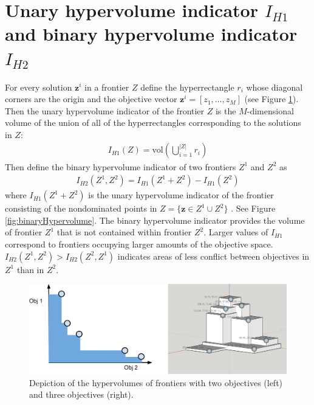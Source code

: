 \section{Unary hypervolume indicator $I_{H1}$ and binary hypervolume indicator $I_{H2}$}
\label{sec:hypervolumeIndicator}
For every solution $\mathbf{z}^i$ in a frontier $Z$ define the hyperrectangle $r_i$ whose diagonal corners are the origin and the objective vector $\mathbf{z}^i = [z_1,\ldots,z_M]$ (see Figure \ref{fig:frontierVolumes}). Then the unary hypervolume indicator of the frontier $Z$ is the $M$-dimensional volume of the union of all of the hyperrectangles corresponding to the solutions in $Z$:
\begin{align}
I_{H1} (Z) = \text{vol} \left( \bigcup_{i = 1}^{|Z|} r_i \right)
\end{align}
Then define the binary hypervolume indicator of two frontiers $Z^1$ and $Z^2$ as \cite{zitzler1999evolutionary}
\begin{align}
I_{H2} (Z^1,Z^2) = I_{H1} (Z^1 + Z^2) - I_{H1} (Z^2)
\end{align}
where $I_{H1} (Z^1 + Z^2)$ is the unary hypervolume indicator of the frontier consisting of the nondominated points in $Z = \{\mathbf{z} \in Z^1 \cup Z^2\}$ . See Figure \ref{fig:binaryHypervolume}. The binary hypervolume indicator provides the volume of frontier $Z^1$ that is not contained within frontier $Z^2$. Larger values of $I_{H1}$ correspond to frontiers occupying larger amounts of the objective space. $I_{H2}(Z^1, Z^2) > I_{H2}(Z^2, Z^1)$ indicates areas of less conflict between objectives in $Z^1$ than in $Z^2$.

\begin{figure}[ht]
\centering
\includegraphics[width=.85\textwidth]{../images/FrontierVolumesNo2DOutlines}
\caption[Hypervolume of Pareto frontiers]{Depiction of the hypervolumes of frontiers with two objectives (left) and three objectives (right).}
\label{fig:frontierVolumes}
\end{figure}

